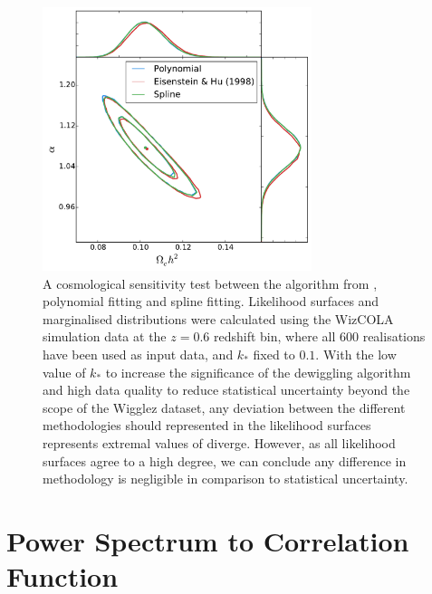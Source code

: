 \documentclass[titlesmallcaps, examinerscopy, copyrightpage]{uqthesis}
\begin{document}
\begin{appendices}
\begin{figure}[h!]
  \begin{center}
    \includegraphics[width=0.7\textwidth]{images/AcosmologyTest.pdf}
  \end{center}
  \caption{A cosmological sensitivity test between the algorithm from \citet{EisensteinHu1998}, polynomial fitting and spline fitting. Likelihood surfaces and marginalised distributions were calculated using the WizCOLA simulation data at the $z=0.6$ redshift bin, where all 600 realisations have been used as input data, and $k_*$ fixed to $0.1$. With the low value of $k_*$ to increase the significance of the dewiggling algorithm and high data quality to reduce statistical uncertainty beyond the scope of the Wigglez dataset, any deviation between the different methodologies should represented in the likelihood surfaces represents extremal values of diverge. However, as all likelihood surfaces agree to a high degree, we can conclude any difference in methodology is negligible in comparison to statistical uncertainty.}
  \label{fig:AcosmologyTest}
\end{figure}










\chapter{Power Spectrum to Correlation Function} \label{app:pk2xi}


\end{appendices}
\end{document}
